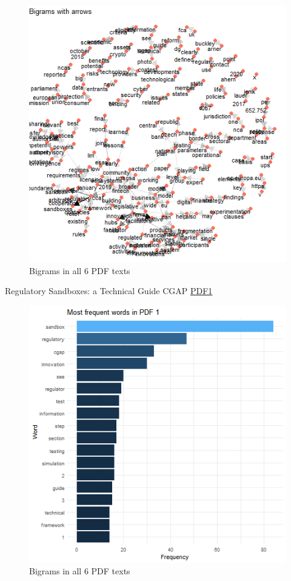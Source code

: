\documentclass[
]{book}
\begin{document}
\begin{figure}

{\centering \includegraphics[width=0.8\linewidth]{img/bigrams3} 

}

\caption{Bigrams in all 6 PDF texts}\label{fig:nice-figB1}
\end{figure}

Regulatory Sandboxes: a Technical Guide CGAP
\href{https://www.cgap.org/research/publication/how-build-regulatory-sandbox-practical-guide-policy-makers}{PDF1}

\begin{figure}

{\centering \includegraphics[width=0.8\linewidth]{img/freqP1} 

}

\caption{Bigrams in all 6 PDF texts}\label{fig:nice-figF1}
\end{figure}
\end{document}
